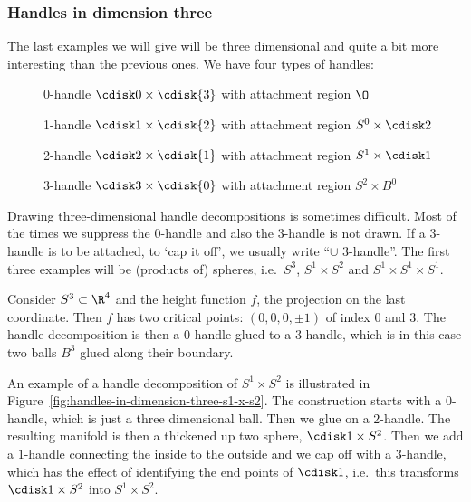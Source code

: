 \subsubsection*{Handles in dimension three}
The last examples we will give will be three dimensional and quite a bit more interesting than the previous ones.
We have four types of handles:


\begin{description}
    \item[]  0-handle  $ \cdisk0 \times \cdisk{3}$ with attachment region $\O$ 
    \item[] 1-handle  $ \cdisk1 \times \cdisk{2}$ with attachment region $ S^{0} \times \cdisk 2$
    \item[] 2-handle  $ \cdisk2 \times \cdisk{1}$ with attachment region $ S^{1} \times \cdisk1$
    \item[] 3-handle  $ \cdisk3 \times \cdisk{0}$ with attachment region $S^{2} \times B^{0}$
\end{description}

Drawing three-dimensional handle decompositions is sometimes difficult. Most of the times we suppress the $0$-handle and also the $3$-handle is not drawn. If a $3$-handle is to be attached, to `cap it off', we usually write ``$\cup $ $3$-handle''.
The first three examples will be (products of) spheres, i.e.\ $S^{3}$, $S^{1} \times S^{2}$ and $S^{1} \times S^{1} \times S^{1}$.
\begin{eg}
    Consider $S^{3} \subset \R^{4}$ and the height function $f$, the projection on the last coordinate.
    Then $f$ has two critical points: $(0, 0, 0, \pm 1)$ of index $0$ and $3$.
    The handle decomposition is then a $0$-handle glued to a $3$-handle, which is in this case two balls $B^{3}$ glued along their boundary.
\end{eg}

\begin{eg}
    An example of a handle decomposition of $S^{1} \times S^{2}$ is illustrated in Figure~\ref{fig:handles-in-dimension-three-s1-x-s2}.
    The construction starts with a $0$-handle, which is just a three dimensional ball.
    Then we glue on a $2$-handle.
    The resulting manifold is then a thickened up two sphere, $\cdisk 1 \times S^{2}$.
    Then we add a $1$-handle connecting the inside to the outside and we cap off with a $3$-handle, which has the effect of identifying the end points of $\cdisk 1$, i.e.\ this transforms  $\cdisk 1 \times S^{2}$ into $ S^1 \times S^{2}$.
\end{eg}

